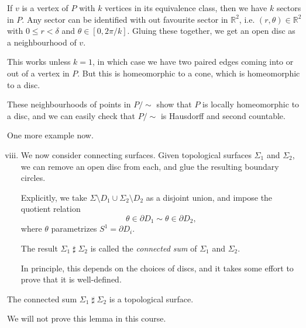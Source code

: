 \documentclass[12pt]{article}
\DeclareMathOperator{\hash}{\sharp}%
\begin{document}
\begin{proofbox}
	If $v$ is a vertex of $P$ with $k$ vertices in its equivalence class, then we have $k$ sectors in $P$. Any sector can be identified with out favourite sector in $\mathbb{R}^2$, i.e. $(r, \theta) \in \mathbb{R}^2$ with $0 \leq r < \delta$ and $\theta \in [0, 2\pi/k]$. Gluing these together, we get an open disc as a neighbourhood of $v$.

	This works unless $k = 1$, in which case we have two paired edges coming into or out of a vertex in $P$. But this is homeomorphic to a cone, which is homeomorphic to a disc.

	These neighbourhoods of points in $P/\sim$ show that $P$ is locally homeomorphic to a disc, and we can easily check that $P/\sim$ is Hausdorff and second countable.
\end{proofbox}

\begin{exbox}
	One more example now.
	\begin{enumerate}[(i)]
		\setcounter{enumi}{7}
		\item We now consider connecting surfaces. Given topological surfaces $\Sigma_1$ and $\Sigma_2$, we can remove an open disc from each, and glue the resulting boundary circles.

			Explicitly, we take $\Sigma \setminus D_1 \cup \Sigma_2 \setminus D_2$ as a disjoint union, and impose the quotient relation
			\[
			\theta \in \partial D_1 \sim \theta \in \partial D_2
			,\]
			where $\theta$ parametrizes $S^{1} = \partial D_i$.

			The result $\Sigma_1 \hash \Sigma_2$ is called the \emph{connected sum} of $\Sigma_1$ and $\Sigma_2$.

			In principle, this depends on the choices of discs, and it takes some effort to prove that it is well-defined.
	\end{enumerate}
\end{exbox}

\begin{lemma}
	The connected sum $\Sigma_1 \hash \Sigma_2$ is a topological surface.
\end{lemma}

We will not prove this lemma in this course.


\newpage

\printindex
\end{document}
